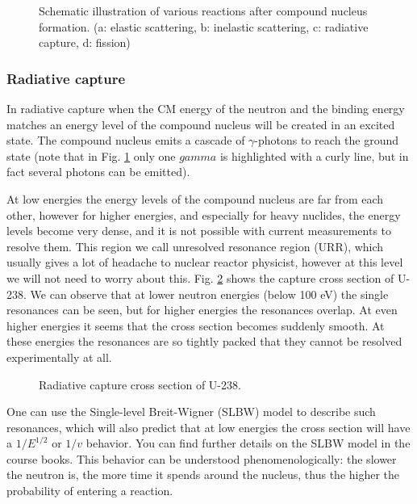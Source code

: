 \begin{figure}[ht!]
\caption{\label{fig:levels} \footnotesize{Schematic illustration of various reactions after compound nucleus formation. (a: elastic scattering, b: inelastic scattering, c: radiative capture, d: fission)}}
\end{figure}


\subsubsection*{Radiative capture}

In radiative capture when the CM energy of the neutron and the binding energy matches an energy level of the compound nucleus will be created in an excited state. The compound nucleus emits a cascade of $\gamma$-photons to reach the ground state (note that in Fig. \ref{fig:levels} only one $gamma$ is highlighted with a curly line, but in fact several photons can be emitted).

At low energies the energy levels of the compound nucleus are far from each other, however for higher energies, and especially for heavy nuclides, the energy levels become very dense, and it is not possible with current measurements to resolve them. This region we call unresolved resonance region (URR), which usually gives a lot of headache to nuclear reactor physicist, however at this level we will not need to worry about this. Fig. \ref{fig:u238cap} shows the capture cross section of U-238. We can observe that at lower neutron energies (below 100 eV) the single resonances can be seen, but for higher energies the resonances overlap. At even higher energies it seems that the cross section becomes suddenly smooth. At these energies the resonances are so tightly packed that they cannot be resolved experimentally at all.


\begin{figure}[ht!]
\protect {}\protect
\caption{\label{fig:u238cap} \footnotesize{Radiative capture cross section of U-238.}}
\end{figure}

One can use the Single-level Breit-Wigner (SLBW) model to describe such resonances, which will also predict that at low energies the cross section will have a $1/E^{1/2}$ or $1/v$ behavior. You can find further details on the SLBW model in the course books. This behavior can be understood phenomenologically: the slower the neutron is, the more time it spends around the nucleus, thus the higher the probability of entering a reaction. 

